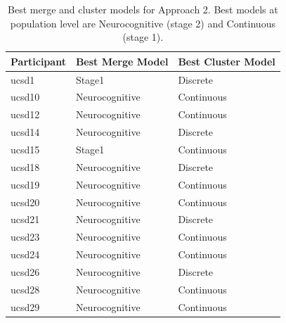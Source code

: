 \begin{table}[H] 
 \caption{Best merge and cluster models for Approach 2. Best models at population level are Neurocognitive (stage 2) and Continuous (stage 1).}
 \begin{tabularx}{\textwidth}{RRR}
 \toprule
 \textbf{Participant} & \textbf{Best Merge Model} & \textbf{Best Cluster Model} \\
 \midrule
 ucsd1  & Stage1           & Discrete   \\
ucsd10 & Neurocognitive   & Continuous \\
ucsd12 & Neurocognitive   & Continuous \\
ucsd14 & Neurocognitive   & Discrete   \\
ucsd15 & Stage1           & Continuous \\
ucsd18 & Neurocognitive   & Discrete   \\
ucsd19 & Neurocognitive   & Continuous \\
ucsd20 & Neurocognitive   & Continuous \\
ucsd21 & Neurocognitive   & Discrete   \\
ucsd23 & Neurocognitive   & Continuous \\
ucsd24 & Neurocognitive   & Continuous \\
ucsd26 & Neurocognitive   & Discrete   \\
ucsd28 & Neurocognitive   & Continuous \\
ucsd29 & Neurocognitive   & Continuous \\
 \bottomrule
 \end{tabularx}
 \label{tab:approach2_best_all}
\end{table}



